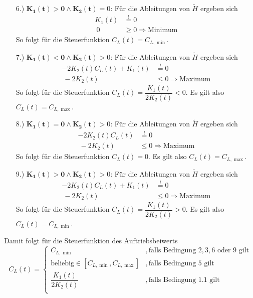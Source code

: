 \begin{enumerate}
\begin{enumerate}
        \item[6.)] $\mathbf{K_1(t) > 0 \wedge K_2(t)} = 0$: Für die Ableitungen von $\tilde{H}$ ergeben sich
        \[\begin{split}
        K_1(t) &\stackrel{!}{=} 0 \\\
        0 &\geq 0 \Rightarrow \text{Minimum}
        \end{split}\]
        So folgt für die Steuerfunktion $C_L(t) = C_{L, \min}$.
        \item[7.)] $\mathbf{K_1(t) < 0 \wedge K_2(t)} > 0$: Für die Ableitungen von $\tilde{H}$ ergeben sich
        \[\begin{split}
        - 2 K_2(t) C_L(t) + K_1(t) &\stackrel{!}{=} 0 \\\
        - 2 K_2(t) &\leq 0 \Rightarrow \text{Maximum}
        \end{split}\]
        So folgt für die Steuerfunktion $C_L(t) = \dfrac{K_1(t)}{2 K_2(t)} < 0$. Es gilt also $C_L(t) = C_{L, \max}$.
        \item[8.)] $\mathbf{K_1(t) = 0 \wedge K_2(t)} > 0$: Für die Ableitungen von $\tilde{H}$ ergeben sich
        \[\begin{split}
        - 2 K_2(t) C_L(t) &\stackrel{!}{=} 0 \\\
        - 2 K_2(t) &\leq 0 \Rightarrow \text{Maximum}
        \end{split}\]
        So folgt für die Steuerfunktion $C_L(t) = 0$. Es gilt also $C_L(t) = C_{L, \max}$.
        \item[9.)] $\mathbf{K_1(t) > 0 \wedge K_2(t)} > 0$: Für die Ableitungen von $\tilde{H}$ ergeben sich
        \[\begin{split}
        - 2 K_2(t) C_L(t) + K_1(t) &\stackrel{!}{=} 0 \\\
        - 2 K_2(t) &\leq 0 \Rightarrow \text{Maximum}
        \end{split}\]
        So folgt für die Steuerfunktion $C_L(t) = \dfrac{K_1(t)}{2 K_2(t)} > 0$. Es gilt also $C_L(t) = C_{L, \min}$.
    \end{enumerate}
    Damit folgt für die Steuerfunktion des Auftriebsbeiwerts
    \[C_L(t) = \left\lbrace 
    \begin{array}{ll}
        C_{L, \min} & ,\text{falls Bedingung } 2,3,6 \text{ oder } 9 \text{ gilt} \\ 
        \text{beliebig} \in [C_{L, \min},C_{L, \max}] & ,\text{falls Bedingung } 5 \text{ gilt} \\ 
        \dfrac{K_1(t)}{2 K_2(t)} & ,\text{falls Bedingung } 1.1 \text{ gilt} \\ 

\end{array}\]
\end{enumerate}
